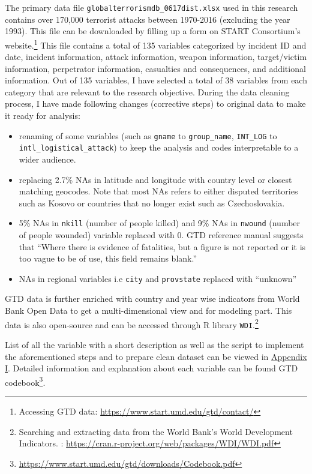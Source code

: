 \documentclass[11pt,oneside,a4paper]{reedthesis}
\providecommand{\tightlist}{%
  \setlength{\itemsep}{0pt}\setlength{\parskip}{0pt}}
\begin{document}
The primary data file \texttt{globalterrorismdb\_0617dist.xlsx} used in
this research contains over 170,000 terrorist attacks between 1970-2016
(excluding the year 1993). This file can be downloaded by filling up a
form on START Consortium's website.\footnote{Accessing GTD data:
  \url{https://www.start.umd.edu/gtd/contact/}} This file contains a
total of 135 variables categorized by incident ID and date, incident
information, attack information, weapon information, target/victim
information, perpetrator information, casualties and consequences, and
additional information. Out of 135 variables, I have selected a total of
38 variables from each category that are relevant to the research
objective. During the data cleaning process, I have made following
changes (corrective steps) to original data to make it ready for
analysis:
\begin{itemize}
\tightlist
\item
  renaming of some variables (such as \texttt{gname} to
  \texttt{group\_name}, \texttt{INT\_LOG} to
  \texttt{intl\_logistical\_attack}) to keep the analysis and codes
  interpretable to a wider audience.
\item
  replacing 2.7\% NAs in latitude and longitude with country level or
  closest matching geocodes. Note that most NAs refers to either
  disputed territories such as Kosovo or countries that no longer exist
  such as Czechoslovakia.
\item
  5\% NAs in \texttt{nkill} (number of people killed) and 9\% NAs in
  \texttt{nwound} (number of people wounded) variable replaced with 0.
  GTD reference manual suggests that ``Where there is evidence of
  fatalities, but a figure is not reported or it is too vague to be of
  use, this field remains blank.''
\item
  NAs in regional variables i.e \texttt{city} and \texttt{provstate}
  replaced with ``unknown''
\end{itemize}
GTD data is further enriched with country and year wise indicators from
World Bank Open Data to get a multi-dimensional view and for modeling
part. This data is also open-source and can be accessed through R
library \texttt{WDI}.\footnote{Searching and extracting data from the
  World Bank's World Development Indicators. :
  \url{https://cran.r-project.org/web/packages/WDI/WDI.pdf}}

List of all the variable with a short description as well as the script
to implement the aforementioned steps and to prepare clean dataset can
be viewed in \protect\hyperlink{appendix-i}{Appendix I}. Detailed
information and explanation about each variable can be found GTD
codebook\footnote{\url{https://www.start.umd.edu/gtd/downloads/Codebook.pdf}}.
\end{document}

